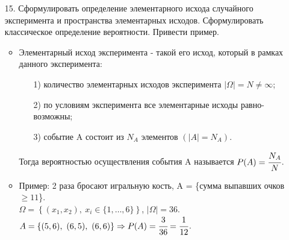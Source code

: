 \documentclass[a4paper]{article}
\begin{document}
\begin{enumerate}
\item[15.] Сформулировать определение элементарного исхода случайного эксперимента и пространства элементарных исходов. Сформулировать классическое определение вероятности. Привести пример. \\
\begin{itemize}
\item Элементарный исход эксперимента - такой его исход, который в рамках данного эксперимента:
	\begin{enumerate}
	\item[1)] количество элементарных исходов эксперимента $|\Omega| = N \neq \infty$;
	\item[2)] по условиям эксперимента все элементарные исходы равно-возможны;
	\item[3)] событие A состоит из $N_A$ элементов $(|A| = N_A)$. 
	\end{enumerate}
Тогда вероятностью осуществления события A называется $P(A) = \cfrac{N_A}{N}$.
\item Пример: 2 раза бросают игральную кость, A = \{сумма выпавших очков $\geqslant 11$\}. \\
$\Omega = \left\{ (x_1, x_2), \ x_i \in \{1, \ldots, 6\} \right\}$, $|\Omega| = 36$. $A = \left\{ (5,6), \ (6,5), \ (6,6) \right\} \Rightarrow P(A) = \cfrac{3}{36} = \cfrac{1}{12}$.
\end{itemize}




\end{enumerate}
\end{document}
